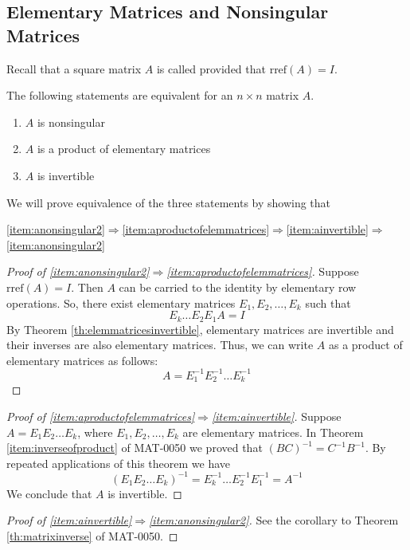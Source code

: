 \documentclass{ximera}
\begin{document}
\subsection*{Elementary Matrices and Nonsingular Matrices} 

Recall that a square matrix $A$ is called  provided that $\mbox{rref}(A)=I$.

\begin{theorem}\label{th:elemmatrices}
The following statements are equivalent for an $n\times n$ matrix $A$.
\begin{enumerate}
\item\label{item:anonsingular2} $A$ is nonsingular
\item\label{item:aproductofelemmatrices} $A$ is a product of elementary matrices
\item\label{item:ainvertible} $A$ is invertible
\end{enumerate}
\end{theorem}
We will prove equivalence of the three statements by showing that
\begin{center}
\ref{item:anonsingular2}$\Rightarrow$\ref{item:aproductofelemmatrices}$\Rightarrow$\ref{item:ainvertible}$\Rightarrow$\ref{item:anonsingular2}
\end{center}
\begin{proof}[Proof of \ref{item:anonsingular2}$\Rightarrow$\ref{item:aproductofelemmatrices}]
Suppose $\mbox{rref}(A)=I$.  Then $A$ can be carried to the identity by elementary row operations.  So, there exist elementary matrices $E_1, E_2, \ldots ,E_k$ such that 
$$E_k\ldots E_2E_1A=I$$
By Theorem \ref{th:elemmatricesinvertible}, elementary matrices are invertible and their inverses are also elementary matrices.  Thus, we can write $A$ as a product of elementary matrices as follows:
$$A=E_1^{-1}E_2^{-1}\ldots E_k^{-1}$$
\end{proof}
\begin{proof}[Proof of \ref{item:aproductofelemmatrices}$\Rightarrow$\ref{item:ainvertible}]
Suppose $A=E_1E_2\ldots E_k$, where $E_1, E_2, \ldots , E_k$ are elementary matrices.  In Theorem \ref{item:inverseofproduct} of MAT-0050 we proved that $(BC)^{-1} = C^{-1} B^{-1}$.  By repeated applications of this theorem we have
$$(E_1E_2\ldots E_k)^{-1}=E_k^{-1}\ldots E_2^{-1}E_1^{-1}=A^{-1}$$
We conclude that $A$ is invertible.
\end{proof}
\begin{proof}[Proof of \ref{item:ainvertible}$\Rightarrow$\ref{item:anonsingular2}]
See the corollary to Theorem \ref{th:matrixinverse} of MAT-0050.
\end{proof}
\end{document}
